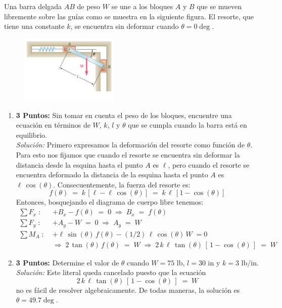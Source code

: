 \documentclass[ a4paper, twoside, 11pt]{article}
\begin{document}
\begin{problem}
Una barra delgada $AB$ de peso $W$ se une a los bloques $A$ y $B$ que se mueven libremente sobre las gu\'ias como se muestra en la siguiente figura. El resorte, que tiene una constante $k$, se encuentra sin deformar cuando $\theta = 0\deg$. 

\begin{figure}[hb]
\centering
\includegraphics[width=0.42\textwidth]{prob-equilibrio.jpg}
\end{figure}

\begin{enumerate}[label=\textbf{\alph*)}]
\item \textbf{3 Puntos:} Sin tomar en cuenta el peso de los bloques, encuentre una ecuaci\'on en t\'erminos de $W$, $k$, $l$ y $\theta$ que se cumpla cuando la barra est\'a en equilibrio. \\[1ex] \emph{Soluci\'on:} Primero expresamos la deformaci\'on del resorte como funci\'on de $\theta$. Para esto nos fijamos que cuando el resorte se encuentra sin deformar la distancia desde la esquina hasta el punto $A$ es $\ell$, pero cuando el resorte se encuentra deformado la distancia de la esquina hasta el punto $A$ es $\ell \, \cos(\theta)$. Consecuentemente, la fuerza del resorte es: 
\[
f(\theta) \; = \; k \, [ \ell - \ell \, \cos(\theta) ] \; = \; k \, \ell \, [ 1 - \cos(\theta) ]
\]
Entonces, bosquejando el diagrama de cuerpo libre tenemos: 
\begin{align*}
\sum F_x \; \colon \;
& +B_x - f(\theta) \; = \; 0 \; \Longrightarrow \; B_x \; = \; f(\theta) \\[1ex]
\sum F_y \; \colon \;
& +A_y - W \; = \; 0 \; \Longrightarrow \; A_y \; = \; W \\[1ex]
\sum M_A \; \colon \;
& +\ell \, \sin(\theta) \, f(\theta) - (1/2) \, \ell \, \cos(\theta) \, W \; = 0 \\[1ex]
& \Longrightarrow \; 2 \, \tan(\theta) \, f(\theta) \; = \; W \; \Longrightarrow \;
2 \, k \, \ell \, \tan(\theta) \, [ \, 1 - \cos(\theta) \, ] \; = \; W
\end{align*}

\item \textbf{3 Puntos:} Determine el valor de $\theta$ cuando $W = 75$ lb, $l = 30$ in y $k = 3$ lb/in. \\[1ex] \emph{Soluci\'on:} Este literal queda cancelado puesto que la ecuaci\'on 
\[
2 \, k \, \ell \, \tan(\theta) \, [ \, 1 - \cos(\theta) \, ] \; = \; W
\]
no es f\'acil de resolver algebraicamente. De todas maneras, la soluci\'on es $\theta = 49.7\deg$. 

\end{enumerate}

\end{problem}
\fullskip
\end{document}
